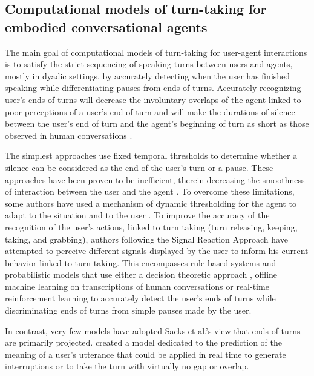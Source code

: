 \documentclass[twocolumn]{svjour3}
\begin{document}
\subsection{Computational models of turn-taking for embodied conversational agents}
\label{comp_modelling}

The main goal of computational models of turn-taking for user-agent interactions is to satisfy the strict sequencing of speaking turns between users and agents, mostly in
dyadic settings, by accurately detecting when the user has finished speaking while differentiating pauses from ends of turns. Accurately recognizing user's ends of turns
will decrease the involuntary overlaps of the agent linked to poor perceptions of a user's end of turn and will make the durations of silence between the user's end of turn and the agent's beginning of turn as short as those observed in human conversations \citep{balentine_debouncing_1997,ward_root_2005,raux_optimizing_2012,jonsdottir_distributed_2013}.

The simplest approaches use fixed temporal thresholds to determine whether a silence can be considered as the end of the user's turn or a pause. 
These approaches have been proven to be inefficient, therein decreasing the smoothness of interaction between the user and the agent \citep{ward_root_2005}. 
To overcome these limitations, some authors have used a mechanism of dynamic thresholding for the agent to adapt to the
situation and to the user \citep{bohus_decisions_2011,witt_modeling_2014}. To improve the accuracy of the recognition of the user’s actions, linked to turn taking (turn releasing, keeping, taking, and grabbing), authors following the Signal Reaction Approach \citep{duncan_signals_1972} have attempted to perceive different signals displayed by the user to inform his current behavior linked to turn-taking.   
This encompasses rule-based systems \citep{cassell_embodiment_1999,thorisson_natural_2002} and probabilistic
models that use either a decision theoretic approach \citep{bohus_decisions_2011,raux_optimizing_2012}, offline machine learning on transcriptions of human conversations \citep{schlangen_reaction_2006,huang_multimodal_2011} or real-time reinforcement learning \citep{jonsdottir_distributed_2013} to accurately detect the user's ends of turns while discriminating ends of turns from simple pauses made by the user. 

In contrast, very few models have adopted Sacks et al.'s view that ends of turns are primarily projected. \citep{de_vault_incremental_2011} created a model dedicated to the prediction of the meaning of a user's utterance that could be applied in real time to generate interruptions or to take the turn with virtually no gap or overlap.
\end{document}
